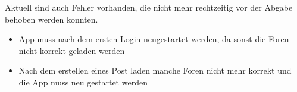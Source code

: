 Aktuell sind auch Fehler vorhanden, die nicht mehr rechtzeitig vor der Abgabe
behoben werden konnten. 
\begin{itemize}
  \item App muss nach dem ersten Login neugestartet werden, da sonst die Foren
  nicht korrekt geladen werden
  \item Nach dem erstellen eines Post laden manche Foren nicht mehr korrekt und
  die App muss neu gestartet werden
\end{itemize}
